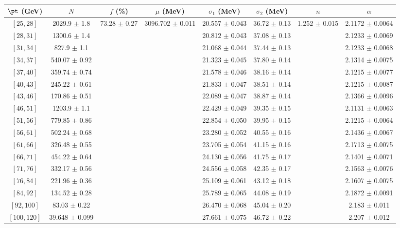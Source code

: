 \begin{tabular}{c||c|c|c|c|c|c|c}
$\pt$ (GeV) & $N$ & $f$ (\%) & $\mu$ (MeV) & $\sigma_1$ (MeV) & $\sigma_2$ (MeV) & $n$ & $\alpha$ \\
\hline
$[25, 28]$ & 2029.9 $\pm$ 1.8 & \multirow{17}{*}{73.28 $\pm$ 0.27} & \multirow{17}{*}{3096.702 $\pm$ 0.011} & 20.557 $\pm$ 0.043 & 36.72 $\pm$ 0.13 & \multirow{17}{*}{1.252 $\pm$ 0.015} & 2.1172 $\pm$ 0.0064\\
$[28, 31]$ & 1300.6 $\pm$ 1.4 &  &  & 20.812 $\pm$ 0.043 & 37.08 $\pm$ 0.13 &  & 2.1233 $\pm$ 0.0069\\
$[31, 34]$ & 827.9 $\pm$ 1.1 &  &  & 21.068 $\pm$ 0.044 & 37.44 $\pm$ 0.13 &  & 2.1233 $\pm$ 0.0068\\
$[34, 37]$ & 540.07 $\pm$ 0.92 &  &  & 21.323 $\pm$ 0.045 & 37.80 $\pm$ 0.14 &  & 2.1314 $\pm$ 0.0075\\
$[37, 40]$ & 359.74 $\pm$ 0.74 &  &  & 21.578 $\pm$ 0.046 & 38.16 $\pm$ 0.14 &  & 2.1215 $\pm$ 0.0077\\
$[40, 43]$ & 245.22 $\pm$ 0.61 &  &  & 21.833 $\pm$ 0.047 & 38.51 $\pm$ 0.14 &  & 2.1215 $\pm$ 0.0087\\
$[43, 46]$ & 170.86 $\pm$ 0.51 &  &  & 22.089 $\pm$ 0.047 & 38.87 $\pm$ 0.14 &  & 2.1366 $\pm$ 0.0096\\
$[46, 51]$ & 1203.9 $\pm$ 1.1 &  &  & 22.429 $\pm$ 0.049 & 39.35 $\pm$ 0.15 &  & 2.1131 $\pm$ 0.0063\\
$[51, 56]$ & 779.85 $\pm$ 0.86 &  &  & 22.854 $\pm$ 0.050 & 39.95 $\pm$ 0.15 &  & 2.1215 $\pm$ 0.0064\\
$[56, 61]$ & 502.24 $\pm$ 0.68 &  &  & 23.280 $\pm$ 0.052 & 40.55 $\pm$ 0.16 &  & 2.1436 $\pm$ 0.0067\\
$[61, 66]$ & 326.48 $\pm$ 0.55 &  &  & 23.705 $\pm$ 0.054 & 41.15 $\pm$ 0.16 &  & 2.1713 $\pm$ 0.0075\\
$[66, 71]$ & 454.22 $\pm$ 0.64 &  &  & 24.130 $\pm$ 0.056 & 41.75 $\pm$ 0.17 &  & 2.1401 $\pm$ 0.0071\\
$[71, 76]$ & 332.17 $\pm$ 0.56 &  &  & 24.556 $\pm$ 0.058 & 42.35 $\pm$ 0.17 &  & 2.1563 $\pm$ 0.0076\\
$[76, 84]$ & 221.96 $\pm$ 0.36 &  &  & 25.109 $\pm$ 0.061 & 43.12 $\pm$ 0.18 &  & 2.1607 $\pm$ 0.0075\\
$[84, 92]$ & 134.52 $\pm$ 0.28 &  &  & 25.789 $\pm$ 0.065 & 44.08 $\pm$ 0.19 &  & 2.1872 $\pm$ 0.0091\\
$[92, 100]$ & 83.03 $\pm$ 0.22 &  &  & 26.470 $\pm$ 0.068 & 45.04 $\pm$ 0.20 &  & 2.183 $\pm$ 0.011\\
$[100, 120]$ & 39.648 $\pm$ 0.099 &  &  & 27.661 $\pm$ 0.075 & 46.72 $\pm$ 0.22 &  & 2.207 $\pm$ 0.012\\
\end{tabular}
